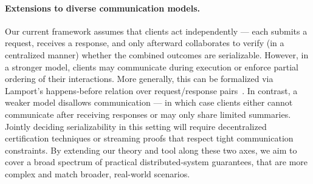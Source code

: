

\paragraph{Extensions to diverse communication models.}

Our current framework assumes that clients act independently --- each submits a request, receives a response, and only afterward collaborates to verify (in a centralized manner) whether the combined outcomes are serializable. However, in a stronger model, clients may communicate during execution or enforce partial ordering of their interactions. More generally, this can be formalized via Lamport’s happens‐before relation over request/response pairs~\cite{La78}. 
%
In contrast, a weaker model disallows communication --- in which case clients either cannot communicate after receiving responses or may only share limited summaries. Jointly deciding serializability in this setting will require decentralized certification techniques or streaming proofs that respect tight communication constraints. 
%
By extending our theory and tool along these two axes, we aim to cover a broad spectrum of practical distributed‐system guarantees, that are more complex and match broader, real-world scenarios.

%
%
%
